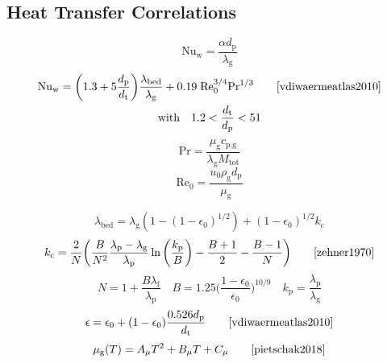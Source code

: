 \subsection{Heat Transfer Correlations}
\begin{equation}
    \label{app:eq:nusselt-number}
    \mathrm{Nu}_\text{w} = \frac{\alpha d_\text{p}}{\lambda_\text{g}}
\end{equation}
\begin{equation}
    \label{app:eq:nusselt-number-VDI}
    \begin{gathered}
        \mathrm{Nu}_\text{w} = \bigg (1.3 + 5 \frac{d_\text{p}}{d_\text{t}} \bigg) \frac{\lambda_\text{bed}}{\lambda_\text{g}}
        + 0.19 \; \mathrm{Re}_0^{3/4} \mathrm{Pr}^{1/3}
        \quad \quad \text{\cite{vdiwaermeatlas2010}} \\
        \text{with} \quad 1.2 < \frac{d_\text{t}}{d_\text{p}} < 51
    \end{gathered}
\end{equation}
\begin{equation}
    \label{app:eq:prandl-number}
    \mathrm{Pr} = \frac{\mu_\text{g} c_\text{p,g}}{\lambda_\text{g} M_\text{tot}}
\end{equation}
\begin{equation}
    \label{app:eq:reynolds-number}
    \mathrm{Re}_0 = \frac{u_0 \rho_\text{g} d_\text{p}}{\mu_\text{g}}
\end{equation}


\begin{equation}
    \label{app:eq:radial-heat-conductivity}
    \lambda_\text{bed} = \lambda_\text{g} (1-(1-\epsilon_0)^{1/2}) + (1-\epsilon_0)^{1/2}k_\text{c}
\end{equation}
\begin{equation}
    \label{app:eq:k-core}
    k_\text{c} = \frac{2}{N} \bigg (\frac{B}{N^2} \frac{\lambda_\text{p} - \lambda_\text{g}}{\lambda_\text{p}}
    \ln \bigg(\frac{k_\text{p}}{B} \bigg) - \frac{B+1}{2} - \frac{B-1}{N}\bigg)
    \quad \quad \text{\cite{zehner1970}}
\end{equation}
\begin{equation}
    \label{app:eq:k-core-auxillary-variables}
    N = 1 + \frac{B \lambda_\text{f}}{\lambda_\text{p}} \quad
    B = 1.25 \bigg (\frac{1-\epsilon_0}{\epsilon_0} \bigg)^{10/9} \quad
    k_\text{p} = \frac{\lambda_\text{p}}{\lambda_\text{g}}
\end{equation}
\begin{equation}
    \label{app:eq:bed-porosity}
    \epsilon = \epsilon_0 + (1-\epsilon_0) \frac{0.526 d_\text{p}}{d_\text{t}}
    \quad \quad \text{\cite{vdiwaermeatlas2010}}
\end{equation}
\begin{equation}
    \label{app:eq:gas-viscosity-function-temperature}
    \mu_\text{g}(T) = A_\mu T^2 + B_\mu T + C_\mu \quad \quad \text{\cite{pietschak2018}}
\end{equation}


